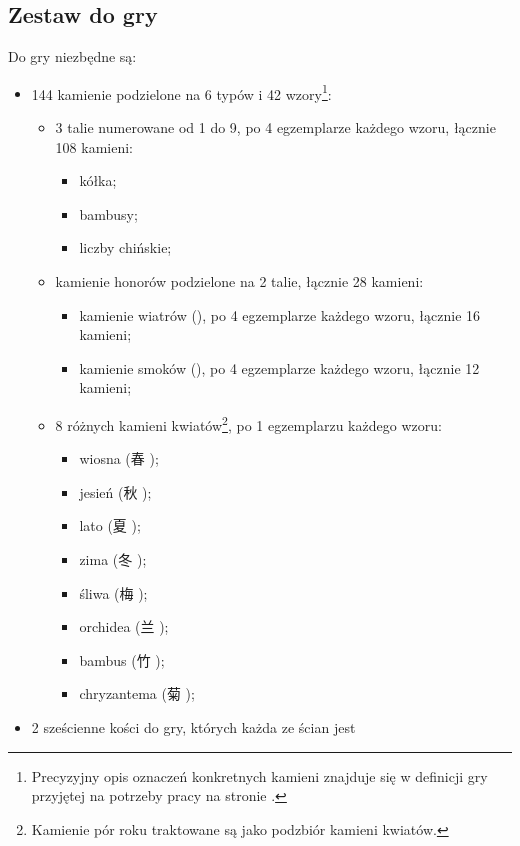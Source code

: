 \subsection{Zestaw do gry}
\label{guobiao_zestaw}
Do gry niezbędne są:
\begin{itemize}
  \item 144 kamienie podzielone na 6 typów i 42 wzory\footnote{Precyzyjny opis
  oznaczeń konkretnych kamieni znajduje się w definicji gry przyjętej na
  potrzeby pracy na stronie \pageref{definicja}.}:
  \begin{itemize}
    \item 3 talie numerowane od 1 do 9, po
    4 egzemplarze każdego wzoru, łącznie 108 kamieni:
    \begin{itemize}
      \item kółka;
      \item bambusy;
      \item liczby chińskie;
    \end{itemize}
    \item kamienie honorów podzielone na 2 talie, łącznie 28 kamieni:
    \begin{itemize}
      \item kamienie wiatrów (\wiatry), po 4 egzemplarze każdego wzoru, łącznie
      16 kamieni;
      \item kamienie smoków (\smoki), po 4 egzemplarze każdego wzoru, łącznie 12
      kamieni;
    \end{itemize}
    \item 8 różnych kamieni kwiatów\footnote{Kamienie pór roku traktowane są
    jako podzbiór kamieni kwiatów.}, po 1 egzemplarzu każdego wzoru:
    \begin{itemize}
      \item wiosna (春 );
      \item jesień (秋 );
      \item lato (夏 );
      \item zima (冬 );
      \item śliwa (梅 );
      \item orchidea (兰 );
      \item bambus (竹 );
      \item chryzantema (菊 );
    \end{itemize}
  \end{itemize}
  \item 2 sześcienne kości do gry, których każda ze ścian jest

\end{itemize}
